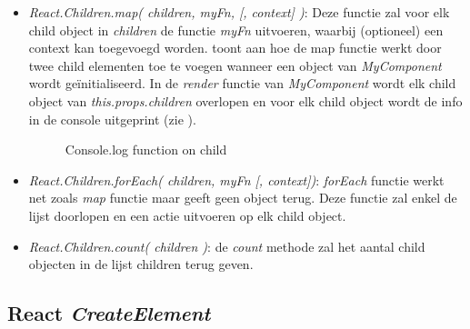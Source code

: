 		\begin{itemize}
			\item \emph{React.Children.map( children, myFn, [, context] )}: Deze functie zal voor elk child object in \emph{children} de functie \emph{myFn} uitvoeren, waarbij (optioneel) een context kan toegevoegd worden.
			 toont aan hoe de map functie werkt door twee child elementen toe te voegen wanneer een object van \emph{MyComponent} wordt geïnitialiseerd. In de \emph{render} functie van \emph{MyComponent} wordt elk child object van \emph{this.props.children} overlopen en voor elk child object wordt de info in de console uitgeprint (zie ).
			\begin{figure}%
				\centering
				\caption{Console.log function on child}%
				\label{fig:mapconsole}%
			\end{figure}
			\item \emph{React.Children.forEach( children, myFn [, context])}: \emph{forEach} functie werkt net zoals \emph{map} functie maar geeft geen object terug. Deze functie zal enkel de lijst doorlopen en een actie uitvoeren op elk child object.
			\item \emph{React.Children.count( children )}: de \emph{count} methode zal het aantal child objecten in de lijst children terug geven.
		\end{itemize}
	
	\subsection{React \emph{CreateElement}}
		

